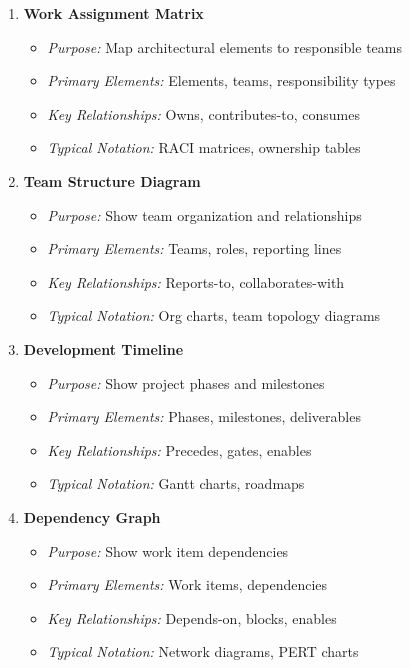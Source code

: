 \documentclass[11pt,letterpaper]{article}
\begin{document}
\begin{enumerate}[label=\textbf{MT\arabic*:}, leftmargin=2.5em]
    \item \textbf{Work Assignment Matrix}
    \begin{itemize}[nosep]
        \item \textit{Purpose:} Map architectural elements to responsible teams
        \item \textit{Primary Elements:} Elements, teams, responsibility types
        \item \textit{Key Relationships:} Owns, contributes-to, consumes
        \item \textit{Typical Notation:} RACI matrices, ownership tables
    \end{itemize}
    
    \item \textbf{Team Structure Diagram}
    \begin{itemize}[nosep]
        \item \textit{Purpose:} Show team organization and relationships
        \item \textit{Primary Elements:} Teams, roles, reporting lines
        \item \textit{Key Relationships:} Reports-to, collaborates-with
        \item \textit{Typical Notation:} Org charts, team topology diagrams
    \end{itemize}
    
    \item \textbf{Development Timeline}
    \begin{itemize}[nosep]
        \item \textit{Purpose:} Show project phases and milestones
        \item \textit{Primary Elements:} Phases, milestones, deliverables
        \item \textit{Key Relationships:} Precedes, gates, enables
        \item \textit{Typical Notation:} Gantt charts, roadmaps
    \end{itemize}
    
    \item \textbf{Dependency Graph}
    \begin{itemize}[nosep]
        \item \textit{Purpose:} Show work item dependencies
        \item \textit{Primary Elements:} Work items, dependencies
        \item \textit{Key Relationships:} Depends-on, blocks, enables
        \item \textit{Typical Notation:} Network diagrams, PERT charts
    \end{itemize}
    

\end{enumerate}
\end{document}

